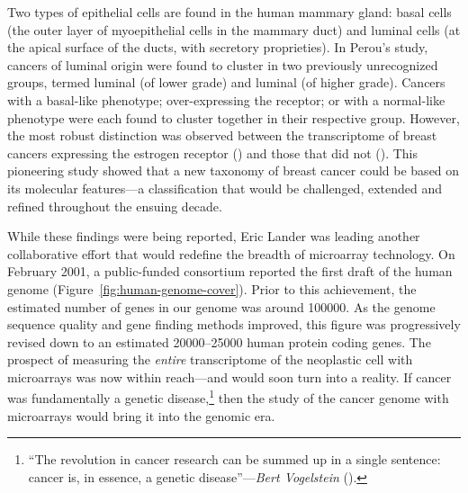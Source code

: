 Two types of epithelial cells are found in the human mammary gland: basal cells
(the outer layer of myoepithelial cells in the mammary duct) and luminal cells
(at the apical surface of the ducts, with secretory proprieties).  In Perou's
study, cancers of luminal origin were found to cluster in two previously
unrecognized groups, termed luminal  (of lower grade) and luminal
 (of higher grade).  Cancers with a \mbox{basal-like} phenotype;
\mbox{over-expressing} the  receptor; or with a normal-like
phenotype were each found to cluster together in their respective group.
However, the most robust distinction was observed between the transcriptome of
breast cancers expressing the estrogen receptor () and those that
did not ().  This pioneering study showed that a new taxonomy of
breast cancer could be based on its molecular features---a classification that
would be challenged, extended and refined throughout the ensuing
decade.\cite{sorlie_gene_2001,sorlie_repeated_2003,hu_molecular_2006,pusztai_molecular_2006,rakha_basal-like_2008,parker_supervised_2009,gusterson_basal-like_2009,weigelt_contribution_2010,prat_deconstructing_2011}


While these findings were being reported, Eric Lander was leading another
collaborative effort that would redefine the breadth of microarray technology.
On February 2001, a \mbox{public-funded} consortium reported the first draft of
the human genome (Figure~\ref{fig:human-genome-cover}).  Prior to this
achievement, the estimated number of genes in our genome was around
\num{100000}.\cite{cox_assessing_1994} As the genome sequence quality and gene
finding methods improved, this figure was progressively revised down to an
estimated \numrange{20000}{25000} human protein coding genes.  The prospect of
measuring the \emph{entire} transcriptome of the neoplastic cell with
microarrays was now within reach---and would soon turn into a reality.  If
cancer was fundamentally a genetic disease,\footnote{``The revolution in cancer
  research can be summed up in a single sentence: cancer is, in essence, a
  genetic disease''---\emph{Bert Vogelstein}
  (\citealp{vogelstein_cancer_2004}).} then the study of the cancer genome with
microarrays would bring it into the genomic era.

